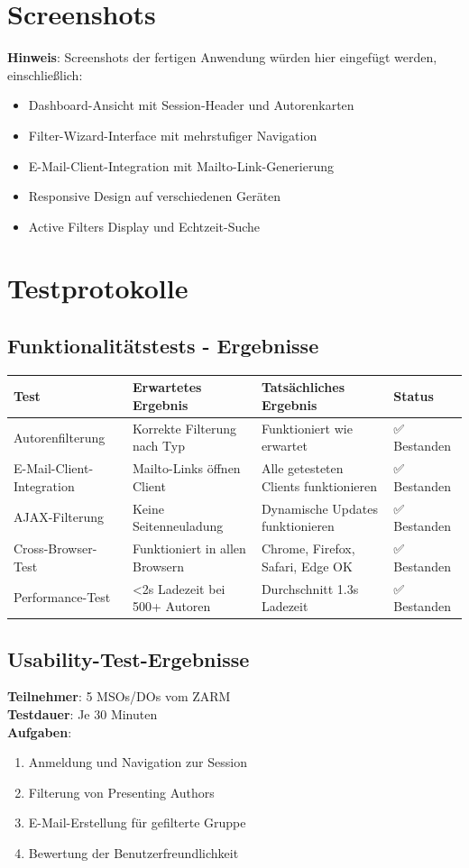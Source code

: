 \documentclass[11pt,a4paper]{article}
\begin{document}
\section{Screenshots}
\textbf{Hinweis}: Screenshots der fertigen Anwendung würden hier eingefügt werden, einschließlich:
\begin{itemize}
    \item Dashboard-Ansicht mit Session-Header und Autorenkarten
    \item Filter-Wizard-Interface mit mehrstufiger Navigation
    \item E-Mail-Client-Integration mit Mailto-Link-Generierung
    \item Responsive Design auf verschiedenen Geräten
    \item Active Filters Display und Echtzeit-Suche
\end{itemize}

\section{Testprotokolle}

\subsection{Funktionalitätstests - Ergebnisse}
\begin{center}
\begin{tabular}{|l|l|l|l|}
\hline
\textbf{Test} & \textbf{Erwartetes Ergebnis} & \textbf{Tatsächliches Ergebnis} & \textbf{Status} \\
\hline
Autorenfilterung & Korrekte Filterung nach Typ & Funktioniert wie erwartet & ✅ Bestanden \\
\hline
E-Mail-Client-Integration & Mailto-Links öffnen Client & Alle getesteten Clients funktionieren & ✅ Bestanden \\
\hline
AJAX-Filterung & Keine Seitenneuladung & Dynamische Updates funktionieren & ✅ Bestanden \\
\hline
Cross-Browser-Test & Funktioniert in allen Browsern & Chrome, Firefox, Safari, Edge OK & ✅ Bestanden \\
\hline
Performance-Test & <2s Ladezeit bei 500+ Autoren & Durchschnitt 1.3s Ladezeit & ✅ Bestanden \\
\hline
\end{tabular}
\end{center}

\subsection{Usability-Test-Ergebnisse}
\textbf{Teilnehmer}: 5 MSOs/DOs vom ZARM \\
\textbf{Testdauer}: Je 30 Minuten \\
\textbf{Aufgaben}: 
\begin{enumerate}
    \item Anmeldung und Navigation zur Session
    \item Filterung von Presenting Authors
    \item E-Mail-Erstellung für gefilterte Gruppe
    \item Bewertung der Benutzerfreundlichkeit
\end{enumerate}
\end{document}
